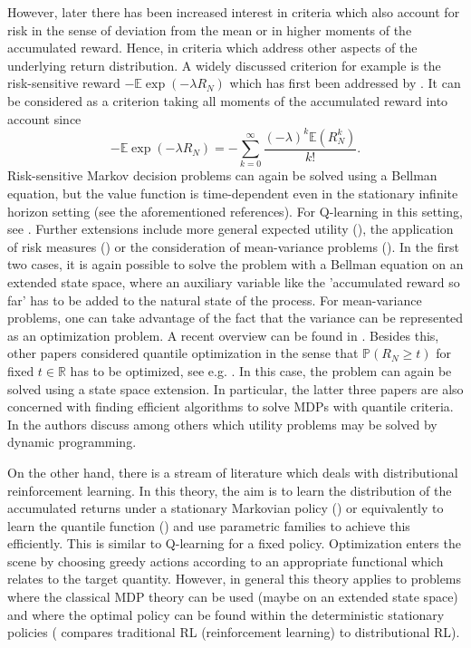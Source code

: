 \documentclass[reqno, 12pt]{amsart}%
\newcommand{\R}{\mathbb{R}} %
\newcommand{\PP}{\mathbb{P}}
\newcommand{\EE}{\mathbb{E}}
\theoremstyle{definition}
\numberwithin{equation}{section} \numberwithin{theorem}{section}
\begin{document}
However, later there has been increased interest in criteria which also account for risk in the sense of deviation from the mean or in higher moments of the accumulated reward. Hence, in criteria which address other aspects of the underlying return distribution. A widely discussed criterion for example is the risk-sensitive reward $-\EE \exp(-\lambda R_N)$ which has first been addressed by \cite{howard1972risk,jaquette1976utility}. It can be considered as a criterion taking all moments of the accumulated reward into account since
$$ -\EE \exp(-\lambda R_N) = - \sum_{k=0}^\infty \frac{(-\lambda)^k\EE(R_N^k)}{k!}.$$
Risk-sensitive Markov decision problems can again be solved using a Bellman equation, but the value function is time-dependent even in the stationary infinite horizon setting (see the aforementioned references). For Q-learning in this setting, see \cite{borkar2002q,mihatsch2002risk,borkar2010learning,shen2014risk}.
Further extensions include more general expected utility (\cite{chung1987discounted,bauerle2014more}), the application of risk measures (\cite{ruszczynski2010risk,bauerle2011markov,shen2013risk,bauerle2021minimizing,moghimi2025beyond}) or the consideration of mean-variance problems (\cite{mannor2011mean,cui2014unified,bauerle2024time,bauerle2025mean}). In the first two cases, it is again possible to solve the problem with a Bellman equation on an extended state space, where an auxiliary variable like the 'accumulated reward so far' has to be added to the natural state of the process. For mean-variance problems, one can take advantage of the fact that the variance can be represented as an optimization problem. A recent overview can be found in \cite{bauerle2024markov}. Besides this, other papers considered quantile optimization in the sense that $\PP(R_N \ge t)$ for fixed $t\in\R$ has to be optimized, see e.g. \cite{filar1995percentile,wu1999minimizing,chow2015risk,gilbert2017optimizing,li2022quantile}. In this case, the problem can again be solved using a state space extension. In particular, the latter three papers are also concerned with finding efficient algorithms to solve MDPs with quantile criteria. In \cite{marthe2024beyond} the authors discuss among others which utility problems may be solved by dynamic programming. 


On the other hand, there is a stream of literature which deals with distributional reinforcement learning. In this theory, the aim is to learn the distribution of the accumulated returns under a stationary Markovian policy (\cite{bellemare2017distributional,bdr2023,rowland2019statistics}) or equivalently to learn the quantile function (\cite{dabney2018distributional,dabney2018implicit}) and use parametric families to achieve this efficiently. This is similar to Q-learning for a fixed policy. Optimization enters the scene by choosing greedy actions according to an appropriate functional which relates to the target quantity. However, in general this theory applies to problems where the classical MDP theory can be used (maybe on an extended state space) and where the optimal policy can be found within the deterministic stationary policies (\cite{lyle2019comparative} compares traditional RL (reinforcement learning) to distributional RL). 
\end{document}
